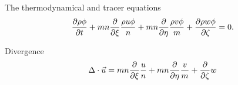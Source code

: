 The thermodynamical and tracer equations
\begin{equation}
  \pd{\rho \phi}{t} + mn\pd{}{\xi}\frac{\rho u\phi}{n} + mn\pd{}{\eta}\frac{\rho v\phi}{m} + \pd{\rho w\phi}{\zeta} = 0.
\end{equation}

Divergence
\begin{equation}
  \Delta\cdot\vec{u} = mn\pd{}{\xi}\frac{u}{n} + mn\pd{}{\eta}\frac{v}{m} + \pd{}{\zeta} w
\end{equation}

%
